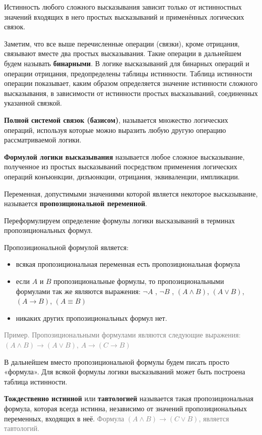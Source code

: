 \documentclass[12pt,letterpaper]{article}
\begin{document}
Истинность любого сложного высказывания зависит только от истинностных значений входящих в него простых высказываний и применённых логических связок.

Заметим, что все выше перечисленные операции (связки), кроме отрицания, связывают вместе два простых высказывания. Такие операции в дальнейшем будем называть \textbf{бинарными}. В логике высказываний для бинарных операций и операции отрицания, предопределены таблицы истинности. Таблица истинности операции показывает, каким образом определяется значение истинности сложного высказывания, в зависимости от истинности простых высказываний, соединенных указанной связкой.

\textbf{Полной системой связок (базисом)}, называется множество логических операций, используя которые можно выразить любую другую операцию рассматриваемой логики.

\textbf{Формулой логики высказывания} называется любое сложное высказывание, полученное из простых высказываний посредством применения логических операций конъюнкции, дизъюнкции, отрицания, эквиваленции, импликации.

Переменная, допустимыми значениями которой является некоторое высказывание, называется \textbf{пропозициональной переменной}.

Переформулируем определение формулы логики высказываний в терминах пропозициональных формул.

Пропозициональной формулой является:
\begin{itemize}
    \item всякая пропозициональная переменная есть пропозициональная формула
    \item если \(A\) и \(B\) пропозициональные формулы, то пропозициональными формулами так же являются выражения: \(\neg A\) , \(\neg B\) , \((A \wedge B )\), \((A \vee B)\), \((A \rightarrow B)\), \((A \equiv B)\)
    \item никаких других пропозициональных формул нет.
\end{itemize}

\textcolor{gray}{
Пример. Пропозициональными формулами являются следующие выражения: \((A \wedge B) \rightarrow (A \vee B)\), \(A \rightarrow (C \rightarrow B)\)
}

В дальнейшем вместо пропозициональной формулы будем писать просто «формула».
Для всякой формулы логики высказываний может быть построена таблица истинности.

\textbf{Тождественно истинной} или \textbf{тавтологией} называется такая пропозициональная формула, которая всегда истинна, независимо от значений пропозициональных переменных, входящих в неё.
\textcolor{gray} {
Формула \((A \wedge B) \rightarrow (C \vee B)\), является тавтологий.
}
\end{document}
